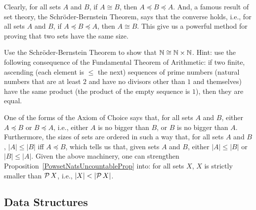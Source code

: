Clearly, for all sets $A$ and $B$,
if $A\cong B$, then $A\preceq B\preceq A$.  And, a famous result
of set theory, the Schr\"oder-Bernstein Theorem,
%
says that the converse holds, i.e.,
for all sets $A$ and $B$, if $A\preceq B\preceq A$, then
$A\cong B$. This give us a powerful method for proving that two
sets have the same size.

\begin{exercise}
Use the Schr\"oder-Bernstein Theorem to show that
$\mathbb{N}\cong\mathbb{N}\times\mathbb{N}$.  Hint: use the following consequence of
the Fundamental Theorem of Arithmetic: if two finite, ascending (each
element is $\leq$ the next) sequences of prime numbers (natural
numbers that are at least $2$ and have no divisors other than $1$ and
themselves) have the same product (the product of the empty sequence is
$1$), then they are equal.
\end{exercise}

One of the forms of the Axiom of Choice
%
says that, for all sets $A$ and $B$, either $A\preceq B$ or $B\preceq
A$, i.e., either $A$ is no bigger than $B$, or $B$ is no bigger than
$A$. Furthermore, the sizes of sets are ordered in such a way
that, for all sets $A$ and $B$, $|A|\leq|B|$ iff $A\preceq B$,
which tells us that, given sets $A$ and $B$, either $|A|\leq|B|$ or
$|B|\leq|A|$.
Given the above machinery, one can strengthen
Proposition~\ref{PowsetNatsUncountableProp} into: for
all sets $X$, $X$ is strictly smaller than ${\cal P} \,X$, i.e.,
$|X|<|\powset\,X|$.
%
%
%
%

\subsection{Data Structures}


